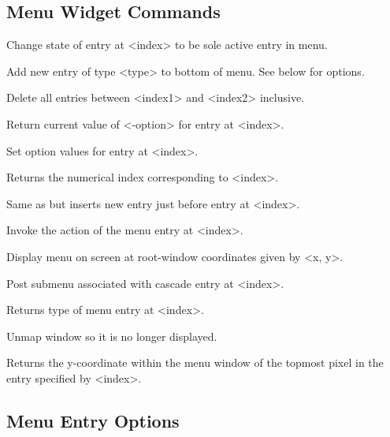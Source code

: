 \subsection*{Menu Widget Commands}
\begin{enum}{1cm}

Change state of entry at <index> to be sole active entry in menu.

Add new entry of type <type> to bottom of menu. See below for options.

Delete all entries between <index1> and <index2> inclusive.

Return current value of <-option> for entry at <index>.

Set option values for entry at <index>.

Returns the numerical index corresponding to <index>.

Same as  but inserts new entry just before entry at <index>.

Invoke the action of the menu entry at <index>.

Display menu on screen at  root-window  coordinates  given by <x, y>.

Post submenu associated with cascade entry at <index>.

Returns type of menu entry at <index>.

Unmap window so it is no longer displayed.

Returns the y-coordinate within the menu window of the topmost pixel
in the entry specified by <index>.

\end{enum}

\subsection*{Menu Entry Options}

